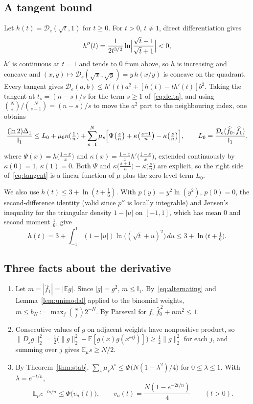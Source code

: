 \documentclass[11pt]{amsart}
\theoremstyle{definition}
\theoremstyle{remark}
\newcommand{\E}{\mathbb E}
\newcommand{\I}{\mathsf I}
\newcommand{\wh}[1]{\widehat{#1}}
\begin{document}
\subsection{A tangent bound}
Let $h(t)=\mathcal D_e(\sqrt t,1)$ for $t\ge0$. For $t>0$, $t\ne1$, direct differentiation gives
\[
 h''(t)=\frac{1}{2t^{3/2}}\ln\Bigl|\frac{\sqrt t-1}{\sqrt t+1}\Bigr|<0,
\]
$h'$ is continuous at $t=1$ and tends to $0$ from above, so $h$ is increasing and concave and $(x,y)\mapsto\mathcal D_e(\sqrt x,\sqrt y)=y\,h(x/y)$ is concave on the quadrant. Every tangent gives $\mathcal D_e(a,b)\le h'(t)a^2+[h(t)-th'(t)]b^2$. Taking the tangent at $t_s=(n-s)/s$ for the term $s\ge1$ of~\eqref{eq:delta}, and using $\binom Ns/\binom N{s-1}=(n-s)/s$ to move the $a^2$ part to the neighbouring index, one obtains
\begin{equation}\label{eq:tangent}
 \frac{(\ln 2)\Delta_1}{\I_1}\le L_0+\mu_0\kappa(\tfrac1n)+\sum_{s=1}^N\mu_s\Bigl[\Psi\bigl(\tfrac sn\bigr)+\kappa\bigl(\tfrac{s+1}n\bigr)-\kappa\bigl(\tfrac sn\bigr)\Bigr],\qquad L_0=\frac{\mathcal D_e(\wh f_0,\wh f_1)}{\I_1},
\end{equation}
where $\Psi(x)=h\bigl(\frac{1-x}x\bigr)$ and $\kappa(x)=\frac{1-x}xh'\bigl(\frac{1-x}x\bigr)$, extended continuously by $\kappa(0)=1$, $\kappa(1)=0$. Both $\Psi$ and $\kappa\bigl(\frac{s+1}n\bigr)-\kappa\bigl(\frac sn\bigr)$ are explicit, so the right side of~\eqref{eq:tangent} is a linear function of $\mu$ plus the zero-level term $L_0$.

We also use $h(t)\le3+\ln(t+\frac16)$. With $p(y)=y^2\ln(y^2)$, $p(0)=0$, the second-difference identity (valid since $p''$ is locally integrable) and Jensen's inequality for the triangular density $1-|u|$ on $[-1,1]$, which has mean $0$ and second moment $\tfrac16$, give
\begin{equation}\label{eq:hbound}
 h(t)=3+\int_{-1}^1(1-|u|)\ln\bigl((\sqrt t+u)^2\bigr)\,du\le3+\ln\bigl(t+\tfrac16\bigr).
\end{equation}

\subsection{Three facts about the derivative}
\begin{enumerate}[label=(\alph*)]
\item Let $m=|\wh f_1|=|\E g|$. Since $|g|=g^2$, $m\le\I_1$. By~\eqref{eq:alternating} and Lemma~\ref{lem:unimodal} applied to the binomial weights, $m\le b_N:=\max_j\binom Nj2^{-N}$. By Parseval for $f$, $\wh f_0^{\,2}+nm^2\le1$.
\item Consecutive values of $g$ on adjacent weights have nonpositive product, so $\|D_jg\|_2^2=\frac12\bigl(\|g\|_2^2-\E[g(x)g(x^{\oplus j})]\bigr)\ge\frac12\|g\|_2^2$ for each $j$, and summing over $j$ gives $\E_\mu s\ge N/2$.
\item By Theorem~\ref{thm:stab}, $\sum_s\mu_s\lambda^s\le\Phi\bigl(N(1-\lambda^2)/4\bigr)$ for $0\le\lambda\le1$. With $\lambda=e^{-t/n}$,
\begin{equation}\label{eq:noise}
 \E_\mu e^{-ts/n}\le\Phi\bigl(v_n(t)\bigr),\qquad v_n(t)=\frac{N(1-e^{-2t/n})}4\qquad(t>0).
\end{equation}
\end{enumerate}
\end{document}
